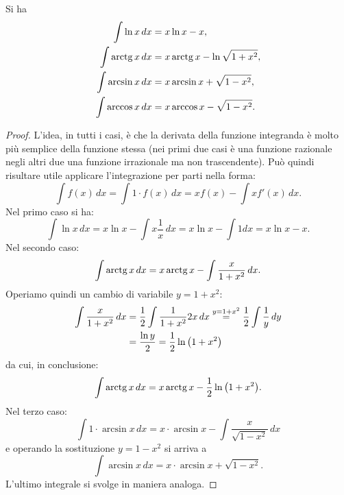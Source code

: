 \begin{theorem}
\mymark{***}
Si ha
\begin{align*}
  \int \ln x\, dx  &= x \ln x - x, \\
  \int \operatorname{arctg} x\, dx &= x \operatorname{arctg} x - \ln \sqrt{1+x^2},\\
  \int \arcsin x\, dx &= x \arcsin x + \sqrt{1-x^2},\\
  \int \arccos x\, dx &= x \arccos x - \sqrt{1-x^2}.
\end{align*}
\end{theorem}
%
\begin{proof}
\mymark{***}
L'idea, in tutti i casi, è che la derivata della funzione integranda
è molto più semplice della funzione stessa (nei primi due casi è una funzione 
razionale negli altri due una funzione irrazionale ma non trascendente).
Può quindi risultare utile applicare l'integrazione
per parti nella forma:
\[
  \int f(x)\, dx = \int 1\cdot f(x)\, dx = x f(x) - \int x f'(x)\, dx.
\]
Nel primo caso si ha:
\[
\int \ln x\, dx = x \ln x - \int x \frac{1}{x}\, dx
 = x \ln x - \int 1 dx = x \ln x - x.
\]
Nel secondo caso:
\[
\int \operatorname{arctg} x\, dx = x \operatorname{arctg} x - \int \frac{x}{1+x^2}\, dx.
\]
Operiamo quindi un cambio di variabile $y=1+x^2$:
\begin{align*}
\int \frac{x}{1+x^2}\, dx
&= \frac{1}{2}\int \frac{1}{1+x^2} 2x \, dx
\stackrel{y=1+x^2} = \frac{1}{2}\int \frac 1 y\, dy \\
&= \frac{\ln y}{2} = \frac{1}{2}\ln{\left( 1+x^2 \right)}
\end{align*}
da cui, in conclusione:
\[
 \int \operatorname{arctg} x\, dx = x \operatorname{arctg} x - \frac 1 2 \ln{\left( 1+x^2 \right)}.
\]
Nel terzo caso:
\[
 \int 1\cdot \arcsin x\, dx = x\cdot \arcsin x - \int\frac{x}{\sqrt{1-x^2}}\, dx  
\]
e operando la sostituzione $y=1-x^2$ si arriva a 
\[
  \int \arcsin x\, dx = x \cdot \arcsin x + \sqrt{1-x^2}.  
\]
L'ultimo integrale si svolge in maniera analoga.
\end{proof}

